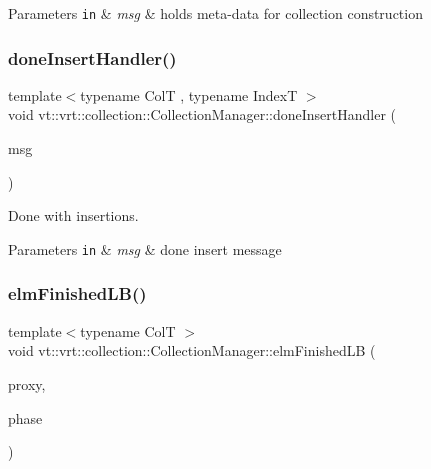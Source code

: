 \begin{DoxyParams}[1]{Parameters}
\mbox{\tt in}  & {\em msg} & holds meta-\/data for collection construction \\
\hline
\end{DoxyParams}
\mbox{\label{structvt_1_1vrt_1_1collection_1_1_collection_manager_ad0d2174c1605c18dfdc028679f1505ae}} 
\subsubsection{\texorpdfstring{done\+Insert\+Handler()}{doneInsertHandler()}}
{\footnotesize\ttfamily template$<$typename ColT , typename IndexT $>$ \\
void vt\+::vrt\+::collection\+::\+Collection\+Manager\+::done\+Insert\+Handler (\begin{DoxyParamCaption}\item[{\hyperlink{structvt_1_1vrt_1_1collection_1_1_done_insert_msg}{Done\+Insert\+Msg}$<$ ColT, IndexT $>$ $\ast$}]{msg }\end{DoxyParamCaption})\hspace{0.3cm}{\ttfamily [static]}}



Done with insertions. 


\begin{DoxyParams}[1]{Parameters}
\mbox{\tt in}  & {\em msg} & done insert message \\
\hline
\end{DoxyParams}
\mbox{\label{structvt_1_1vrt_1_1collection_1_1_collection_manager_aa80bf07ee33e5e75de987ac82b79ae18}} 
\subsubsection{\texorpdfstring{elm\+Finished\+L\+B()}{elmFinishedLB()}}
{\footnotesize\ttfamily template$<$typename ColT $>$ \\
void vt\+::vrt\+::collection\+::\+Collection\+Manager\+::elm\+Finished\+LB (\begin{DoxyParamCaption}\item[{\hyperlink{namespacevt_1_1vrt_a620a5c8c59d13e513f690c74b4af516f}{Virtual\+Elm\+Proxy\+Type}$<$ ColT $>$ const \&}]{proxy,  }\item[{\hyperlink{namespacevt_a46ce6733d5cdbd735d561b7b4029f6d7}{Phase\+Type}}]{phase }\end{DoxyParamCaption})}



